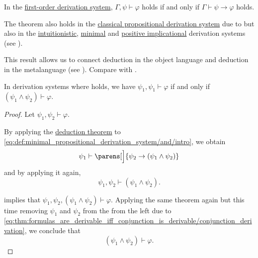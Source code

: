 \begin{proposition}
\begin{proposition}
\begin{theorem}\label{thm:syntactic_deduction_theorem}
  In the \hyperref[def:minimal_propositional_derivation_system]{first-order derivation system}, \( \Gamma, \psi \vdash \varphi \) holds if and only if \( \Gamma \vdash \psi \rightarrow \varphi \) holds.

  The theorem also holds in the \hyperref[def:propositional_derivation_system]{classical propositional derivation system} due to  but also in the \hyperref[def:intuitionistic_propositional_derivation_system]{intuitionistic}, \hyperref[def:intuitionistic_propositional_derivation_system]{minimal} and \hyperref[def:positive_implicational_propositional_derivation_system]{positive implicational} derivation systems (see ).

  This result allows us to connect deduction in the object language and deduction in the metalanguage (see ). Compare with .
\end{theorem}

\begin{proposition}\label{thm:formulas_are_derivable_iff_conjunction_is_derivable}
  In derivation systems where  holds, we have \( \psi_1, \psi_1 \vdash \varphi \) if and only if \( (\psi_1 \wedge \psi_2) \vdash \varphi \).
\end{proposition}
\begin{proof}
  \SufficiencySubProof Let \( \psi_1, \psi_2 \vdash \varphi \).

  By applying the \hyperref[thm:syntactic_deduction_theorem]{deduction theorem} to \eqref{eq:def:minimal_propositional_derivation_system/and/intro}, we obtain
  \begin{equation*}
    \psi_1 \vdash \parens[\Big]{ \psi_2 \rightarrow (\psi_1 \wedge \psi_2) }
  \end{equation*}
  and by applying it again,
  \begin{equation}\label{eq:thm:formulas_are_derivable_iff_conjunction_is_derivable/conjunction_derivation}
    \psi_1, \psi_2 \vdash (\psi_1 \wedge \psi_2).
  \end{equation}

   implies that \( \psi_1, \psi_2, (\psi_1 \wedge \psi_2) \vdash \varphi \). Applying the same theorem again but this time removing \( \psi_1 \) and \( \psi_2 \) from the from the left due to \eqref{eq:thm:formulas_are_derivable_iff_conjunction_is_derivable/conjunction_derivation}, we conclude that
  \begin{equation*}
    (\psi_1 \wedge \psi_2) \vdash \varphi.
  \end{equation*}


\end{proof}
\end{proposition}
\end{proposition}
